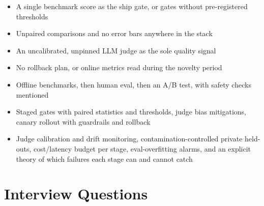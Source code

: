 \begin{interviewq}
\redflags
\begin{itemize}
    \item A single benchmark score as the ship gate, or gates without pre-registered thresholds
    \item Unpaired comparisons and no error bars anywhere in the stack
    \item An uncalibrated, unpinned LLM judge as the sole quality signal
    \item No rollback plan, or online metrics read during the novelty period
\end{itemize}


\goodgreat
\begin{itemize}
    \item {} Offline benchmarks, then human eval, then an A/B test, with safety checks mentioned
    \item {} Staged gates with paired statistics and thresholds, judge bias mitigations, canary rollout with guardrails and rollback
    \item {} Judge calibration and drift monitoring, contamination-controlled private held-outs, cost/latency budget per stage, eval-overfitting alarms, and an explicit theory of which failures each stage can and cannot catch
\end{itemize}

\end{interviewq}

\section{Interview Questions}
\label{sec:eval_interview_questions}

